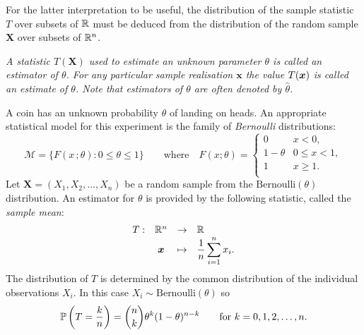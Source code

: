 For the latter interpretation to be useful, the distribution of the sample statistic $T$ over subsets of $\mathbb{R}$ must be deduced from the distribution of the random sample $\mathbf{X}$ over subsets of $\mathbb{R}^n$. 

\begin{definition}
\ben
\it A statistic $T(\mathbf{X})$ used to estimate an unknown parameter $\theta$ is called an \emph{estimator} of $\theta$.
\it For any particular sample realisation $\mathbf{x}$ the value $T(\boldsymbol{x})$ is called an \emph{estimate} of $\theta$.
\een
Note that estimators of $\theta$ are often denoted by $\hat{\theta}$.
\end{definition}

\begin{example}\label{exa:estimate_bernoulli}
A coin has an unknown probability $\theta$ of landing on heads. 
An appropriate statistical model for this experiment is the family of \emph{Bernoulli} distributions:
\[
\mathcal{M} = \big\{F(x\,;\theta):0\leq\theta\leq 1\big\}
\qquad\text{where}\quad
F(x;\theta) = \begin{cases}
0				& x < 0, \\
1-\theta		& 0 \leq x < 1, \\
1				& x \geq 1. \\
\end{cases}
\]
Let $\mathbf{X}=(X_1,X_2,\ldots,X_n)$ be a random sample from the $\text{Bernoulli}(\theta)$ distribution. An estimator for $\theta$ is provided by the following statistic, called the \emph{sample mean}:
\[\begin{array}{rccl}
T:	& \mathbb{R}^n 		& \to 		& \mathbb{R} \\
	& \boldsymbol{x}	& \mapsto	& \displaystyle\frac{1}{n}\sum_{i=1}^n x_i.
\end{array}\]
The distribution of $T$ is determined by the common distribution of the individual observations $X_i$. In this case $X_i\sim\text{Bernoulli}(\theta)$ so %
\[
\mathbb{P}\left(T = \frac{k}{n}\right) = \binom{n}{k}\theta^{k}(1-\theta)^{n-k}
\qquad\text{for $k=0,1,2,\ldots,n$}.
\]
\end{example}


